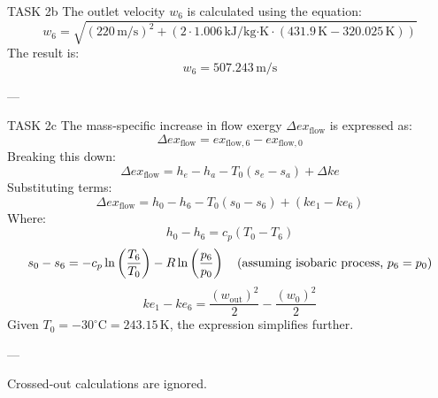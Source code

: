 TASK 2b  
The outlet velocity \( w_6 \) is calculated using the equation:  
\[
w_6 = \sqrt{(220 \, \text{m/s})^2 + (2 \cdot 1.006 \, \text{kJ/kg·K} \cdot (431.9 \, \text{K} - 320.025 \, \text{K}))}
\]  
The result is:  
\[
w_6 = 507.243 \, \text{m/s}
\]

---

TASK 2c  
The mass-specific increase in flow exergy \( \Delta ex_{\text{flow}} \) is expressed as:  
\[
\Delta ex_{\text{flow}} = ex_{\text{flow},6} - ex_{\text{flow},0}
\]  
Breaking this down:  
\[
\Delta ex_{\text{flow}} = h_e - h_a - T_0 (s_e - s_a) + \Delta ke
\]  
Substituting terms:  
\[
\Delta ex_{\text{flow}} = h_0 - h_6 - T_0 (s_0 - s_6) + (ke_1 - ke_6)
\]  
Where:  
\[
h_0 - h_6 = c_p (T_0 - T_6)
\]  
\[
s_0 - s_6 = -c_p \ln \left( \frac{T_6}{T_0} \right) - R \ln \left( \frac{p_6}{p_0} \right) \quad \text{(assuming isobaric process, \( p_6 = p_0 \))}
\]  
\[
ke_1 - ke_6 = \frac{(w_{\text{out}})^2}{2} - \frac{(w_0)^2}{2}
\]  
Given \( T_0 = -30^\circ\text{C} = 243.15 \, \text{K} \), the expression simplifies further.

---

Crossed-out calculations are ignored.